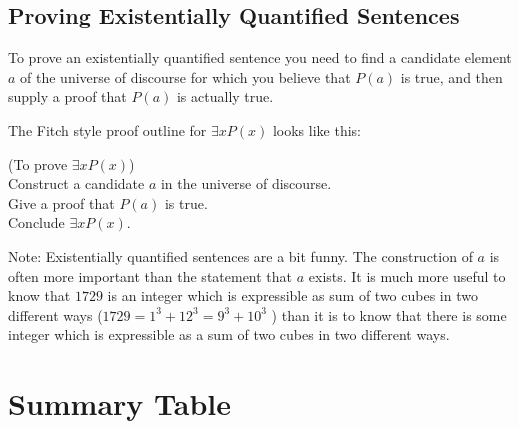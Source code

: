 \documentclass{article}
\begin{document}
\subsection{Proving Existentially Quantified Sentences}

To prove an existentially quantified sentence you need to find a candidate element $a$ of the universe of discourse for which you believe that $P(a)$ is true, and then supply a proof that $P(a)$ is actually true.

The Fitch style proof outline for $\exists x P(x)$ looks like this:

\begin{fitch*}
		\textrm{(To prove $\exists x P(x)$)}\\
		\textrm{Construct a candidate $a$ in the universe of discourse.}\\
		\textrm{Give a proof that $P(a)$ is true.}\\
		\textrm{Conclude $\exists x P(x)$.}
\end{fitch*} 

Note:  Existentially quantified sentences are a bit funny.  The construction of $a$ is often more important than the statement that $a$ exists.  It is much more useful to know that $1729$ is an integer which is expressible as sum of two cubes in two different ways ($1729 = 1^3+12^3 = 9^3+10^3$ ) than it is to know that there is some integer which is expressible as a sum of two cubes in two different ways.

 \newpage
 
\section{Summary Table}
\end{document}
